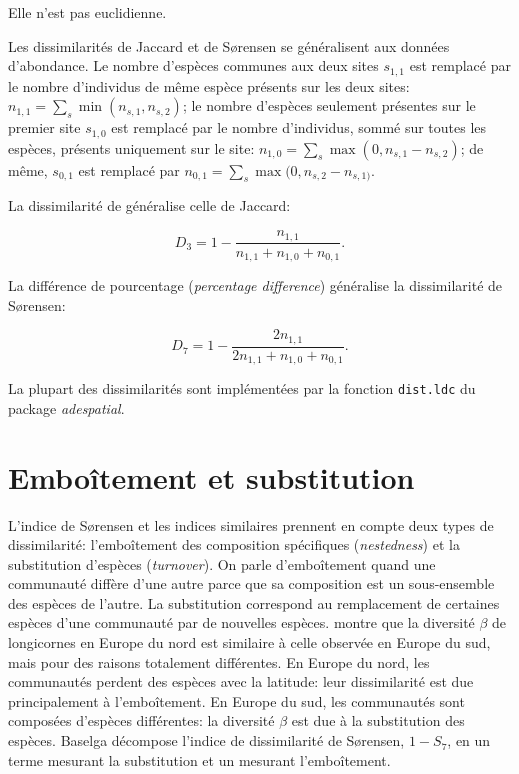 \documentclass[
  11pt,
  french,
  a4paper,
  extrafontsizes,onecolumn,openright
  ]{memoir}
\begin{document}
Elle n'est pas euclidienne.

Les dissimilarités de Jaccard et de Sørensen se généralisent aux données d'abondance.
Le nombre d'espèces communes aux deux sites \(s_{1,1}\) est remplacé par le nombre d'individus de même espèce présents sur les deux sites: \(n_{1,1}=\sum_s{\min(n_{s,1}, n_{s,2})}\); le nombre d'espèces seulement présentes sur le premier site \(s_{1,0}\) est remplacé par le nombre d'individus, sommé sur toutes les espèces, présents uniquement sur le site: \(n_{1,0}=\sum_s{\max(0, n_{s,1}-n_{s,2})}\); de même, \(s_{0,1}\) est remplacé par \(n_{0,1}=\sum_s{\max(0, n_{s,2}-n_{s,1)}}\).

La dissimilarité de \textcite{Ruzicka1958} généralise celle de Jaccard:

\begin{equation}
  \label{eq:Ruzicka}
  D_3 = 1-\frac{n_{1,1}}{n_{1,1}+n_{1,0}+n_{0,1}}.
\end{equation}

La différence de pourcentage (\emph{percentage difference}) généralise la dissimilarité de Sørensen:

\begin{equation}
  \label{eq:percentdiff}
  D_7 = 1- \frac{2n_{1,1}}{2n_{1,1}+n_{1,0}+n_{0,1}}.
\end{equation}

La plupart des dissimilarités sont implémentées par la fonction \texttt{dist.ldc} du package \emph{adespatial}.

\section{Emboîtement et substitution}\label{embouxeetement-et-substitution}

L'indice de Sørensen et les indices similaires prennent en compte deux types de dissimilarité: l'emboîtement des composition spécifiques (\emph{nestedness}) et la substitution d'espèces (\emph{turnover}).
On parle d'emboîtement quand une communauté diffère d'une autre parce que sa composition est un sous-ensemble des espèces de l'autre.
La substitution correspond au remplacement de certaines espèces d'une communauté par de nouvelles espèces.
\textcite{Baselga2010} montre que la diversité \(\beta\) de longicornes en Europe du nord est similaire à celle observée en Europe du sud, mais pour des raisons totalement différentes.
En Europe du nord, les communautés perdent des espèces avec la latitude: leur dissimilarité est due principalement à l'emboîtement.
En Europe du sud, les communautés sont composées d'espèces différentes: la diversité \(\beta\) est due à la substitution des espèces.
Baselga décompose l'indice de dissimilarité de Sørensen, \(1-S_7\), en un terme mesurant la substitution et un mesurant l'emboîtement.
\end{document}
